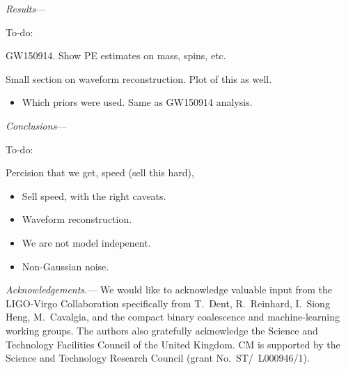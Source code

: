 \documentclass[%
showpacs,
 amsmath,amssymb,
 aps,
 twocolumn,
 prl,
 reprint,
floatfix,
]{revtex4-1}
\begin{document}
\textit{Results}---


To-do:

GW150914. Show PE estimates on mass, spins, etc.

Small section on waveform reconstruction. Plot of this as well.  

\begin{itemize}
\item Which priors were used. Same as GW150914 analysis.
\end{itemize}
\textit{Conclusions}---

To-do:

Percision that we get, speed (sell this hard), 

\begin{itemize}
\item Sell speed, with the right caveats.
\item Waveform reconstruction.
\item We are not model indepenent.
\item Non-Gaussian noise.
\end{itemize}

%
%
\emph{Acknowledgements.}---
%
We would like to acknowledge valuable input from the LIGO-Virgo Collaboration
specifically from T.~Dent, R.~Reinhard, I.~Siong Heng, M.~Cavalgia, and the compact binary coalescence and
machine-learning working groups. The authors also gratefully acknowledge the
Science and Technology Facilities Council of the United Kingdom. CM is
supported by the Science and Technology Research Council (grant
No.~ST/~L000946/1).
%




\end{document}
